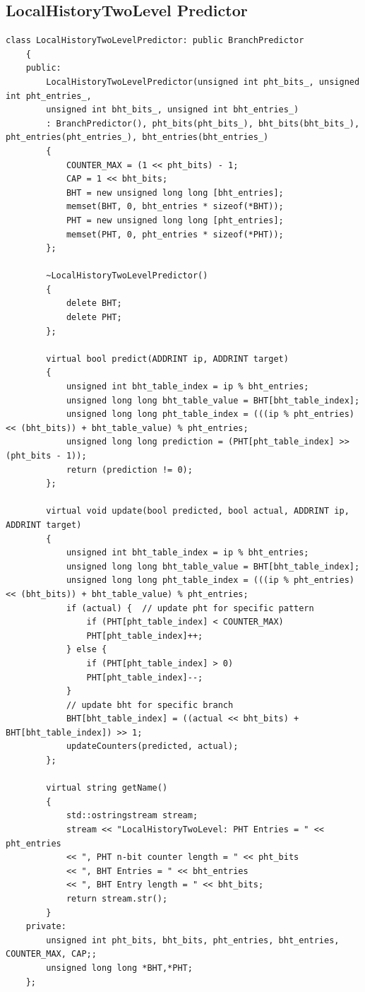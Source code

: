 \documentclass{article}
\newcommand{\eng}[1]{\foreignlanguage{english}{#1}}
\begin{document}
\subsection{\eng{LocalHistoryTwoLevel Predictor}}
\begin{lstlisting}[style=Cstyle]
    class LocalHistoryTwoLevelPredictor: public BranchPredictor
    {
    public:
        LocalHistoryTwoLevelPredictor(unsigned int pht_bits_, unsigned int pht_entries_,
        unsigned int bht_bits_, unsigned int bht_entries_)
        : BranchPredictor(), pht_bits(pht_bits_), bht_bits(bht_bits_), pht_entries(pht_entries_), bht_entries(bht_entries_)
        {
            COUNTER_MAX = (1 << pht_bits) - 1;
            CAP = 1 << bht_bits;
            BHT = new unsigned long long [bht_entries];
            memset(BHT, 0, bht_entries * sizeof(*BHT));
            PHT = new unsigned long long [pht_entries];
            memset(PHT, 0, pht_entries * sizeof(*PHT));
        };

        ~LocalHistoryTwoLevelPredictor()
        {
            delete BHT;
            delete PHT;
        };

        virtual bool predict(ADDRINT ip, ADDRINT target)
        {
            unsigned int bht_table_index = ip % bht_entries;
            unsigned long long bht_table_value = BHT[bht_table_index];
            unsigned long long pht_table_index = (((ip % pht_entries) << (bht_bits)) + bht_table_value) % pht_entries;
            unsigned long long prediction = (PHT[pht_table_index] >> (pht_bits - 1));
            return (prediction != 0);
        };

        virtual void update(bool predicted, bool actual, ADDRINT ip, ADDRINT target)
        {
            unsigned int bht_table_index = ip % bht_entries;
            unsigned long long bht_table_value = BHT[bht_table_index];
            unsigned long long pht_table_index = (((ip % pht_entries) << (bht_bits)) + bht_table_value) % pht_entries;
            if (actual) {  // update pht for specific pattern
                if (PHT[pht_table_index] < COUNTER_MAX)
                PHT[pht_table_index]++;
            } else {
                if (PHT[pht_table_index] > 0)
                PHT[pht_table_index]--;
            }
            // update bht for specific branch
            BHT[bht_table_index] = ((actual << bht_bits) + BHT[bht_table_index]) >> 1;
            updateCounters(predicted, actual);
        };

        virtual string getName()
        {
            std::ostringstream stream;
            stream << "LocalHistoryTwoLevel: PHT Entries = " << pht_entries
            << ", PHT n-bit counter length = " << pht_bits
            << ", BHT Entries = " << bht_entries
            << ", BHT Entry length = " << bht_bits;
            return stream.str();
        }
    private:
        unsigned int pht_bits, bht_bits, pht_entries, bht_entries, COUNTER_MAX, CAP;;
        unsigned long long *BHT,*PHT;
    };
\end{lstlisting}
\clearpage
\end{document}
